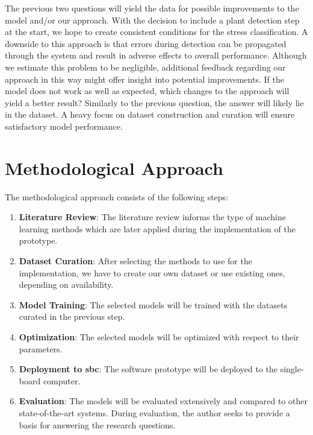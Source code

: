 \documentclass[draft,final]{vutinfth} %
\begin{document}
\begin{enumerate}
  The previous two questions will yield the data for possible
  improvements to the model and/or our approach. With the decision to
  include a plant detection step at the start, we hope to create
  consistent conditions for the stress classification. A downside to
  this approach is that errors during detection can be propagated
  through the system and result in adverse effects to overall
  performance. Although we estimate this problem to be negligible,
  additional feedback regarding our approach in this way might offer
  insight into potential improvements. If the model does not work as
  well as expected, which changes to the approach will yield a better
  result? Similarly to the previous question, the answer will likely
  lie in the dataset. A heavy focus on dataset construction and
  curation will ensure satisfactory model performance.
\end{enumerate}

\section{Methodological Approach}
\label{sec:methods}

The methodological approach consists of the following steps:

\begin{enumerate}
\item \textbf{Literature Review}: The literature review informs the
  type of machine learning methods which are later applied during the
  implementation of the prototype.
\item \textbf{Dataset Curation}: After selecting the methods to use
  for the implementation, we have to create our own dataset or use
  existing ones, depending on availability.
\item \textbf{Model Training}: The selected models will be trained
  with the datasets curated in the previous step.
\item \textbf{Optimization}: The selected models will be optimized
  with respect to their parameters.
\item \textbf{Deployment to \gls{sbc}}: The software prototype will be
  deployed to the single-board computer.
\item \textbf{Evaluation}: The models will be evaluated extensively
  and compared to other state-of-the-art systems. During evaluation,
  the author seeks to provide a basis for answering the research
  questions.
\end{enumerate}
\end{document}
